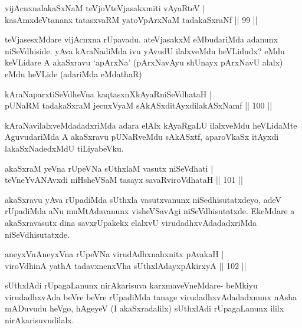 \begin{shl}
vijAcnxnalakaSxNaM teVjoV\s teVjasakxmiti vAyaRteV |\\
kasAmxdeVtananx tatasxvaRM yatoV\s pArxNaM tadakaSxraNf \hfill || 99 ||
\end{shl}

\begin{artha}%
teVjasesxMdare vijAcnxna rUpavadu. ateVjasakxM eMbudariMda adanunx niSeVdhiside. yAva kAraNadiMda ivu yAvudU ilalxveMdu heVLidudx? eMdu keVLidare A akaSxravu `apArxNa' (pArxNavAyu shUnayx pArxNavU alalx) eMdu heVLide (adariMda eMdathaR)
\end{artha}


\begin{shl}
kAraNaparxtiSeVdheVna kaqtasxnXkAyaRniSeVdhataH |\\
pUNaRM tadakaSxraM jecnxVyaM sAkASxditAyxdilakASxNamf \hfill || 100 ||
\end{shl}

\begin{artha}
kAraNavilalxveMdadadxriMda adara elAlx kAyaRgaLU ilalxveMdu heVLidaMte AguvudariMda A akaSxravu pUNaRveMdu sAkASxtf, aparoVkaSx itAyxdi lakaSxNadedxMdU tiLiyabeVku.
\end{artha}

\begin{shl}
akaSxraM yeVna rUpeVNa sUthxlaM vasutx niSeVdhati |\\
teVneYvANAvxdi niHsheVSaM tasayx savaRviroVdhataH \hfill || 101 ||
\end{shl}

\begin{artha}
akaSxravu yAva rUpadiMda sUthxla vasutxvanunx niSedhisutatxdeyo, adeV rUpadiMda aNu muMtAdavanunx visheVSavAgi niSeVdhisutatxde. EkeMdare a akaSxravasutx dina savxrUpakekx elalxvU virudadhxvAdadadxriMda niSeVdhisutatxde.
\end{artha}

\begin{shl}
aneyxVnAneyxVna rUpeVNa virudAdhxnahxnitx pAvakaH |\\
viroVdhinA yathA tadavxnenxVha sUthxlAdayxpAkirxyA \hfill || 102 ||
\end{shl}

\begin{artha}%
sUthxlAdi rUpagaLanunx nirAkarisuva karxmaveVneMdare- beMkiyu virudadhxvAda beVre beVre rUpadiMda tanage virudadhxvAdadadxnunx nAsha mADuvudu heVgo, hAgeyeV (I akaSxradalilx) sUthxlAdi rUpagaLanunx ililx nirAkarisuvudilalx.
\end{artha}

